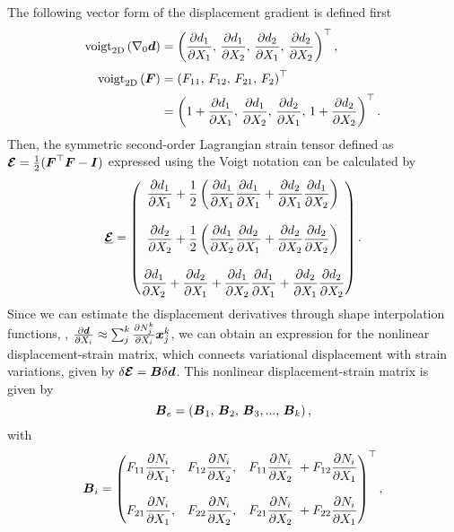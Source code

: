 The following vector form of the displacement gradient is defined first
\begin{align}
\textrm{voigt}_{\textrm{2D}} \left(\nabla_0 {\boldsymbol{d}} \right) & = \left( \frac{\partial d_1}{\partial X_1},\,\frac{\partial d_1}{\partial X_2},\, \frac{\partial d_2}{\partial X_1},\, \frac{\partial d_2}{\partial X_2}\right)^\top, \\[0.25em]
\textrm{voigt}_{\textrm{2D}} \left({\boldsymbol{F}}\right) & = \left( F_{11},\,F_{12},\, F_{21},\,F_{2} \right)^\top \notag \\[0.15em] & = \left( 1 + \frac{\partial d_1}{\partial X_1},\,\frac{\partial d_1}{\partial X_2},\, \frac{\partial d_2}{\partial X_1},\,  1 + \frac{\partial d_2}{\partial X_2}\right)^\top.
\label{eq:app:C3:F} 
\end{align}
%
Then, the symmetric second-order Lagrangian strain tensor defined as ${\boldsymbol{\mathcal{E}}} = \frac{1}{2}({\boldsymbol{F}}^\top {\boldsymbol{F}} - \boldsymbol{I})$ expressed using the Voigt notation can be calculated by
%
\begin{equation}
 \underline{\boldsymbol{\mathcal{E}}} = \begin{pmatrix}
\dfrac{\partial d_1}{\partial X_1} + \dfrac{1}{2} \left(\dfrac{\partial d_1}{\partial X_1}\dfrac{\partial d_1}{\partial X_1} + \dfrac{\partial d_2}{\partial X_1}\dfrac{\partial d_1}{\partial X_2} \right) \\[0.25em] \\
\dfrac{\partial d_2}{\partial X_2} + \dfrac{1}{2} \left(\dfrac{\partial d_1}{\partial X_2}\dfrac{\partial d_2}{\partial X_1} + \dfrac{\partial d_2}{\partial X_2}\dfrac{\partial d_2}{\partial X_2} \right) \\[0.25em] \\
\dfrac{\partial d_1}{\partial X_2} + \dfrac{\partial d_2}{\partial X_1} + \dfrac{\partial d_1}{\partial X_2}\dfrac{\partial d_1}{\partial X_1} + \dfrac{\partial d_2}{\partial X_1}\dfrac{\partial d_2}{\partial X_2}
 \end{pmatrix}.
\end{equation}
%
Since we can estimate the displacement derivatives through shape interpolation functions, \ie, $\frac{\partial {\boldsymbol{d}}}{\partial X_i} \approx \sum_{j}^k \frac{\partial N_{j}^k}{\partial X_i}{\boldsymbol{x}}^k_j$, we can obtain an expression for the nonlinear displacement-strain matrix, which connects variational displacement with strain variations, given by $\delta \boldsymbol{\mathcal{E}} = {\boldsymbol{B}} \delta {\boldsymbol{d}}$. This nonlinear displacement-strain matrix is given by
\begin{equation}
{\boldsymbol{B}}_{e} = \left({\boldsymbol{B}}_1,\,{\boldsymbol{B}}_2,\,{\boldsymbol{B}}_3, ...,\, {\boldsymbol{B}}_{k} \right),
\label{eq:app:C3:straindisplacementmatrix}
\end{equation}
with
\begin{align}
{\boldsymbol{B}}_i = \begin{pmatrix} 
F_{11} \dfrac{\partial N_{i}}{\partial X_1}, & F_{12}  \dfrac{\partial N_{i}}{\partial X_2}, &  F_{11}  \dfrac{\partial N_{i}}{\partial X_2}  \; + F_{12} \dfrac{\partial N_{i}}{\partial X_1} \\[0.25em] \\
F_{21}  \dfrac{\partial N_{i}}{\partial X_1},  & F_{22}  \dfrac{\partial N_{i}}{\partial X_2}, & F_{21}  \dfrac{\partial N_{i}}{\partial X_2} \; + F_{22}  \dfrac{\partial N_{i}}{\partial X_1}  
\end{pmatrix}^\top,
\end{align}
